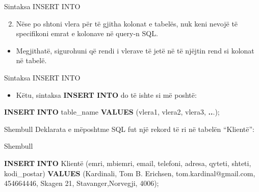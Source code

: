 \documentclass[
  ignorenonframetext,
]{beamer}
\newenvironment{Shaded}{\begin{snugshade}}{\end{snugshade}}
\newcommand{\KeywordTok}[1]{\textcolor[rgb]{0.13,0.29,0.53}{\textbf{#1}}}
\newcommand{\NormalTok}[1]{#1}
\newcommand{\OperatorTok}[1]{\textcolor[rgb]{0.81,0.36,0.00}{\textbf{#1}}}
\newcommand{\StringTok}[1]{\textcolor[rgb]{0.31,0.60,0.02}{#1}}
\providecommand{\tightlist}{%
  \setlength{\itemsep}{0pt}\setlength{\parskip}{0pt}}
\begin{document}
\begin{frame}{Sintaksa INSERT INTO}
\label{sintaksa-insert-into-1}
\begin{enumerate}
\setcounter{enumi}{1}
\tightlist
\item
  Nëse po shtoni vlera për të gjitha kolonat e tabelës, nuk keni nevojë
  të specifikoni emrat e kolonave në query-n SQL.
\end{enumerate}

\begin{itemize}
\tightlist
\item
  Megjithatë, sigurohuni që rendi i vlerave të jetë në të njëjtin rend
  si kolonat në tabelë.
\end{itemize}
\end{frame}

\begin{frame}[fragile]{Sintaksa INSERT INTO}
\label{sintaksa-insert-into-2}
\begin{itemize}
\tightlist
\item
  Këtu, sintaksa \textbf{INSERT INTO} do të ishte si më poshtë:
\end{itemize}

\begin{Shaded}
\begin{Highlighting}[]
  \KeywordTok{INSERT} \KeywordTok{INTO}\NormalTok{ table\_name}
  \KeywordTok{VALUES}\NormalTok{ (vlera1, vlera2, vlera3, }\OperatorTok{..}\NormalTok{.);}
\end{Highlighting}
\end{Shaded}
\end{frame}

\begin{frame}{Shembull}
\label{shembull}
Deklarata e mëposhtme SQL fut një rekord të ri në tabelën ``Klientë'':
\end{frame}

\begin{frame}[fragile]{Shembull}
\label{shembull-1}
\begin{Shaded}
\begin{Highlighting}[]
\KeywordTok{INSERT} \KeywordTok{INTO}\NormalTok{ Klientë (emri, mbiemri, email, telefoni, adresa, qyteti, shteti, kodi\_postar)}
\KeywordTok{VALUES}\NormalTok{ (}\StringTok{\textquotesingle{}Kardinali\textquotesingle{}}\NormalTok{, }\StringTok{\textquotesingle{}Tom B. Erichsen\textquotesingle{}}\NormalTok{, }\StringTok{\textquotesingle{}tom.kardinal@gmail.com\textquotesingle{}}\NormalTok{, }\StringTok{\textquotesingle{}454664446\textquotesingle{}}\NormalTok{, }\StringTok{\textquotesingle{}Skagen 21\textquotesingle{}}\NormalTok{, }\StringTok{\textquotesingle{}Stavanger\textquotesingle{}}\NormalTok{,}\StringTok{\textquotesingle{}Norvegji\textquotesingle{}}\NormalTok{,  }\StringTok{\textquotesingle{}4006\textquotesingle{}}\NormalTok{);}
\end{Highlighting}
\end{Shaded}
\end{frame}
\end{document}
